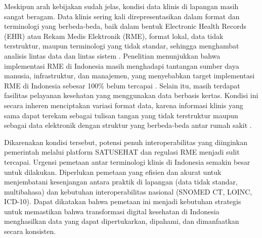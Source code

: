 Meskipun arah kebijakan sudah jelas, kondisi data klinis di lapangan masih sangat beragam. Data klinis sering kali direpresentasikan dalam format dan terminologi yang berbeda-beda, baik dalam bentuk Electronic Health Records (EHR) atau Rekam Medis Elektronik (RME), format lokal, data tidak terstruktur, maupun terminologi yang tidak standar, sehingga menghambat analisis lintas data dan lintas sistem \citep{januel_improved_2011,sathappan_transformation_2021,zhou_novel_2024}. Penelitian menunjukkan bahwa implementasi RME di Indonesia masih menghadapi tantangan sumber daya manusia, infrastruktur, dan manajemen, yang menyebabkan target implementasi RME di Indonesia sebesar 100\% belum tercapai \citep{sugiarto_supporting_2024}. Selain itu, masih terdapat fasilitas pelayanan kesehatan yang menggunakan data berbasis kertas. Kondisi ini secara inheren menciptakan variasi format data, karena informasi klinis yang sama dapat terekam sebagai tulisan tangan yang tidak terstruktur maupun sebagai data elektronik dengan struktur yang berbeda-beda antar rumah sakit \citep{hossain_exploratory_2025}.

Dikarenakan kondisi tersebut, potensi penuh interoperabilitas yang diinginkan pemerintah melalui platform SATUSEHAT dan regulasi RME menjadi sulit tercapai. Urgensi pemetaan antar terminologi klinis di Indonesia semakin besar untuk dilakukan. Diperlukan pemetaan yang efisien dan akurat untuk menjembatani kesenjangan antara praktik di lapangan (data tidak standar, multibahasa) dan kebutuhan interoperabilitas nasional (SNOMED CT, LOINC, ICD-10). Dapat dikatakan bahwa pemetaan ini menjadi kebutuhan strategis untuk memastikan bahwa transformasi digital kesehatan di Indonesia menghasilkan data yang dapat dipertukarkan, dipahami, dan dimanfaatkan secara konsisten.

